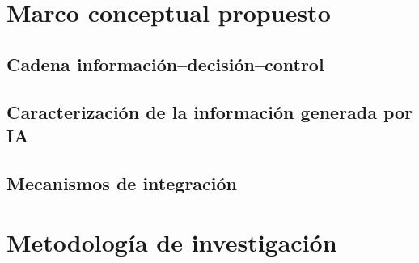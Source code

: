 \documentclass[12pt,a4paper]{report}
\begin{document}

\chapter{Marco conceptual propuesto}

%


\section{Cadena información--decisión--control}

%
%


\section{Caracterización de la información generada por IA}

%
%


\section{Mecanismos de integración}

%
%



\chapter{Metodología de investigación}
\end{document}

